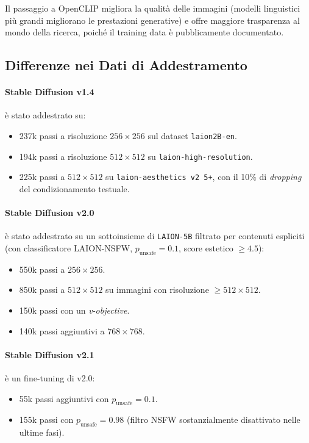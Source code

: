 Il passaggio a OpenCLIP migliora la qualità delle immagini (modelli
linguistici più grandi migliorano le prestazioni generative) e offre
maggiore trasparenza al mondo della ricerca, poiché il training data
è pubblicamente documentato.

\subsection{Differenze nei Dati di Addestramento}
\label{subsec:v1v2-data}

\paragraph{Stable Diffusion v1.4} è stato addestrato su:
\begin{itemize}
  \item 237k passi a risoluzione $256\times256$ sul dataset
        \texttt{laion2B-en}.
  \item 194k passi a risoluzione $512\times512$ su
        \texttt{laion-high-resolution}.
  \item 225k passi a $512\times512$ su \texttt{laion-aesthetics v2 5+},
        con il 10\% di \emph{dropping} del condizionamento testuale.
\end{itemize}

\paragraph{Stable Diffusion v2.0} è stato addestrato su un sottoinsieme
di \texttt{LAION-5B} filtrato per contenuti espliciti (con classificatore
LAION-NSFW, $p_\text{unsafe}=0.1$, score estetico $\geq 4.5$):
\begin{itemize}
  \item 550k passi a $256\times256$.
  \item 850k passi a $512\times512$ su immagini con risoluzione
        $\geq 512\times512$.
  \item 150k passi con un \emph{v-objective}.
  \item 140k passi aggiuntivi a $768\times768$.
\end{itemize}

\paragraph{Stable Diffusion v2.1} è un fine-tuning di v2.0:
\begin{itemize}
  \item 55k passi aggiuntivi con $p_\text{unsafe}=0.1$.
  \item 155k passi con $p_\text{unsafe}=0.98$ (filtro NSFW
        sostanzialmente disattivato nelle ultime fasi).
\end{itemize}

